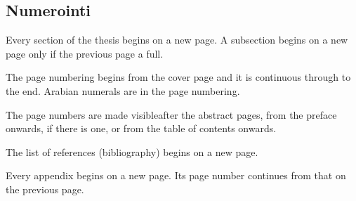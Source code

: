 \vspace{5mm}
{\hfill \ThesisAuthor \hspace{1cm}}

\newpage


\thesistableofcontents



\printnoidxglossary[type=symbolslist, style=long]

\printnoidxglossary[type=operatorslist, style=long]

\printnoidxglossary[type=\acronymtype, style=long, title={Abbreviations}] 

\cleardoublepage



\thispagestyle{empty}


\clearpage


\clearpage



\subsection*{Numerointi}

Every section of the thesis begins on a new page. A subsection begins on a new 
page only if the previous page a full.

The page numbering begins from the cover page and it is continuous through to 
the end. Arabian numerals are in the page numbering.

The page numbers are made visibleafter the abstract pages, from the preface 
onwards, if there is one, or from the table of contents onwards.

The list of references (bibliography) begins on a new page.

Every appendix begins on a new page. Its page number continues from that on the
previous page.

